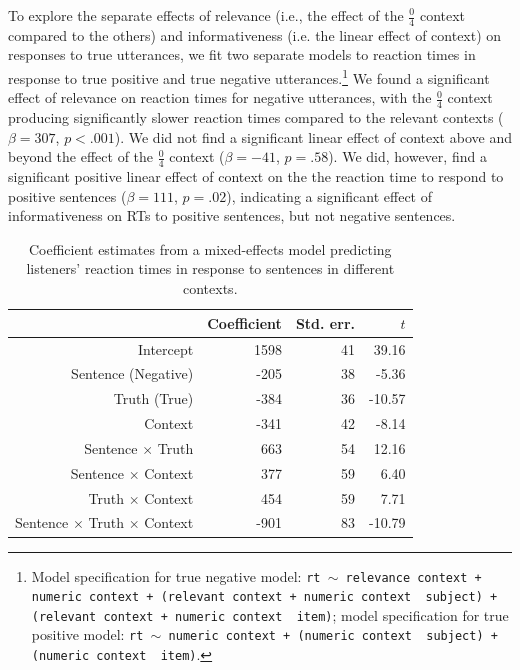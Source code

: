 \documentclass[man, floatsintext, noapacite]{apa6}
\begin{document}
To explore the separate effects of relevance (i.e., the effect of the $\frac{0}{4}$ context compared to the others) and informativeness (i.e. the linear effect of context) on responses to true utterances, we fit two separate models to reaction times in response to true positive and true negative utterances.\footnote{Model specification for true negative model: \texttt{rt $\sim$  relevance context + numeric context + (relevant context + numeric context~\textbar~subject) +  (relevant context + numeric context~\textbar~item)}; model specification for true positive model: \texttt{rt $\sim$  numeric context + (numeric context~\textbar~subject) +  (numeric context~\textbar~item)}.} We found a significant effect of relevance on reaction times for negative utterances, with the $\frac{0}{4}$ context producing significantly slower reaction times compared to the relevant contexts ($\beta= 307$, $p< .001$). We did not find a significant linear effect of context above and beyond the effect of the  $\frac{0}{4}$ context ($\beta= -41$, $p = .58$). We did, however, find a significant positive linear effect of context on the the reaction time to respond to positive sentences ($\beta= 111$, $p = .02$), indicating a significant effect of informativeness on RTs to positive sentences, but not negative sentences. 

\begin{table}
\caption{\label{tab:listenermodel} Coefficient estimates from a mixed-effects model predicting listeners' reaction times in response to sentences in different contexts.}
\begin{center}
\begin{tabular}{rrrr}
  \hline
 & Coefficient & Std. err. & $t$ \\ 
  \hline
Intercept & 1598 & 41 & 39.16 \\ 
  Sentence (Negative) & -205 & 38 & -5.36  \\ 
  Truth (True) & -384 & 36 & -10.57 \\
  Context & -341 & 42 & -8.14 \\ 
  Sentence $\times$ Truth & 663 & 54 & 12.16 \\
  Sentence $\times$ Context & 377 & 59 & 6.40 \\
  Truth $\times$ Context & 454 & 59 & 7.71 \\
  Sentence $\times$ Truth $\times$ Context & -901 & 83 & -10.79 \\
   \hline
\end{tabular}
\vspace{-1.5cm}
\end{center}
\end{table}
\end{document}
